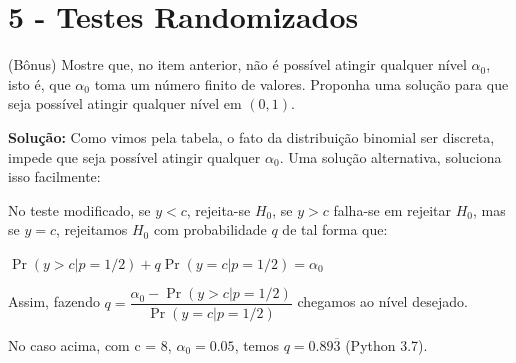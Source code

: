 \documentclass[a4paper,10pt, notitlepage]{report}
\newcommand{\pr}{\operatorname{Pr}} %
\newcommand{\mysection}[2]{\setcounter{section}{#1}\addtocounter{section}{-1}\section*{#1 - #2}}
\begin{document}
	
	\mysection{5}{Testes Randomizados} (Bônus) Mostre que, no item anterior, não é possível atingir qualquer nível $\alpha_0$, isto é, que $\alpha_0$ toma um número finito de valores.
	Proponha uma solução para que seja possível atingir qualquer nível em $(0, 1)$.
	
	\textbf{Solução:}
	\citep{degroot2012probability_random} Como vimos pela tabela, o fato da distribuição binomial ser discreta, impede que seja possível atingir qualquer $\alpha_0$. Uma solução alternativa, soluciona isso facilmente:
	
	No teste modificado, se $y<c$, rejeita-se $H_0$, se $y>c$ falha-se em rejeitar $H_0$, mas se $y=c$, rejeitamos $H_0$ com probabilidade $q$ de tal forma que:
	
	$\pr(y>c|p=1/2)+q\pr(y=c|p=1/2)=\alpha_0$
	
	Assim, fazendo $q=\dfrac{\alpha_0-\pr(y>c|p=1/2)}{\pr(y=c|p=1/2)}$ chegamos ao nível desejado.
	
	No caso acima, com c = 8, $\alpha_0=0.05$, temos $q=0.89\overline{3}$ (Python 3.7).
	
	
	
	
	
	
	
	
	
	
	
	\newpage
	 
	 
	
\end{document}
